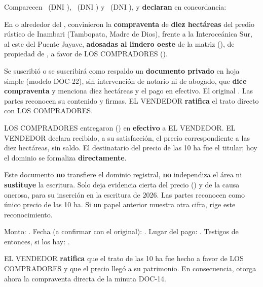 \documentclass[12pt,a4paper]{article}
\begin{document}


\noindent Comparecen \VendedorNombreCompleto\ (DNI \VendedorDNI), \CompradorUnoNombre\ (DNI \CompradorUnoDNI) y \CompradorDosNombre\ (DNI \CompradorDosDNI), y \textbf{declaran} en concordancia:

En o alrededor del \textbf{\FechaPago}, convinieron la \textbf{compraventa} de \textbf{diez hectáreas} del predio rústico de Inambari (Tambopata, Madre de Dios), frente a la Interoceánica Sur, al este del Puente Jayave, \textbf{adosadas al lindero oeste} de la matriz (\CriterioRecorte), de propiedad de \VendedorNombreCompleto, a favor de LOS COMPRADORES (\CompradorParentesco).

Se suscribió o se suscribirá como respaldo un \textbf{documento privado} en hoja simple (modelo DOC-22), sin intervención de notario ni de abogado, que \textbf{dice compraventa} y menciona diez hectáreas y el pago en efectivo. El original . Las partes reconocen su contenido y firmas. EL VENDEDOR \textbf{ratifica} el trato directo con LOS COMPRADORES.

LOS COMPRADORES entregaron \textbf{\MontoPago} (\MontoPagoLetras) en \textbf{efectivo} a EL VENDEDOR. EL VENDEDOR declara recibido, a su satisfacción, el precio correspondiente a las diez hectáreas, sin saldo. El destinatario del precio de las 10 ha fue el titular; hoy el dominio se formaliza \textbf{directamente}.

Este documento \textbf{no} transfiere el dominio registral, \textbf{no} independiza el área ni \textbf{sustituye} la escritura. Solo deja evidencia cierta del precio (\MontoPago) y de la causa onerosa, para su inserción en la escritura de 2026. Las partes reconocen \textbf{\MontoPago} como único precio de las 10 ha. Si un papel anterior muestra otra cifra, rige este reconocimiento.

Monto: \MontoPago. Fecha (a confirmar con el original): \FechaPago. Lugar del pago: . Testigos de entonces, si los hay: .

EL VENDEDOR \textbf{ratifica} que el trato de las 10 ha fue hecho a favor de LOS COMPRADORES y que el precio llegó a su patrimonio. En consecuencia, otorga ahora la compraventa directa de la minuta DOC-14.
\end{document}
